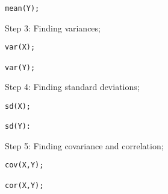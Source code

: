 \begin{example}
\begin{tcolorbox}[colback=gray!10, colframe=gray!50, arc=2mm]
\begin{verbatim}
mean(Y);
\end{verbatim}
\end{tcolorbox}

Step 3: Finding variances;

\begin{tcolorbox}[colback=gray!10, colframe=gray!50, arc=2mm]
\begin{verbatim}
var(X);

var(Y);
\end{verbatim}
\end{tcolorbox}

Step 4: Finding standard deviations;

\begin{tcolorbox}[colback=gray!10, colframe=gray!50, arc=2mm]
\begin{verbatim}
sd(X);

sd(Y):
\end{verbatim}
\end{tcolorbox}

Step 5: Finding covariance and correlation;

\begin{tcolorbox}[colback=gray!10, colframe=gray!50, arc=2mm]
\begin{verbatim}
cov(X,Y);

cor(X,Y);
\end{verbatim}
\end{tcolorbox}
\end{example}

